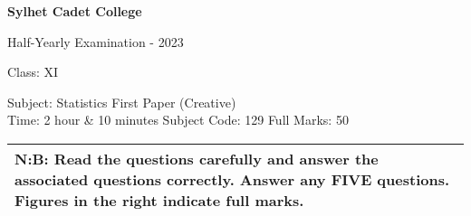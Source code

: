 \documentclass{article}
\begin{document}
\begin{center}
  \bfseries\large
  Sylhet Cadet College

\normalsize
  Half-Yearly Examination - 2023

  Class: XI

  Subject: Statistics First Paper (Creative) 
   \\
  Time: 2 hour \& 10 minutes \qquad \qquad \qquad Subject Code: 129  \qquad  \qquad \qquad Full Marks: 50

\end{center}

\noindent
\begin{tabular}{p{\dimexpr\linewidth-2\tabcolsep}}
  N:B: Read the questions carefully and answer the associated questions correctly. Answer any FIVE questions. Figures in the right indicate full marks.\\
  \hline
\end{tabular}
\end{document}
